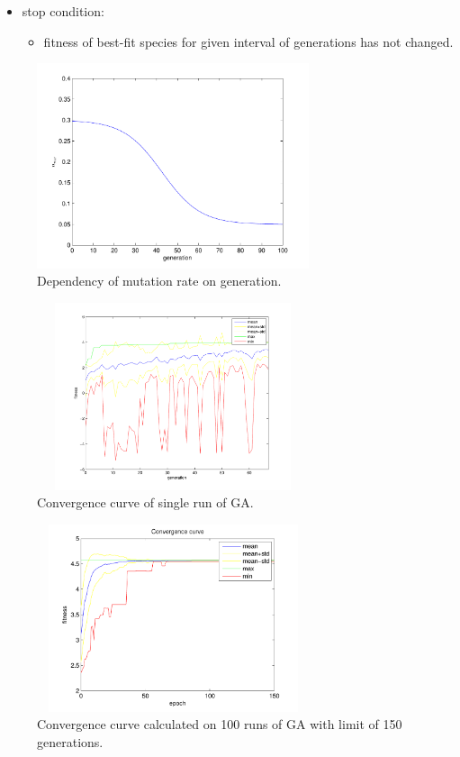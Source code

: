 \documentclass[a4paper,jurnal]{IEEEtran}
\begin{document}
\begin{itemize}
	\item stop condition:
	\begin{itemize}
		\item fitness of best-fit species for given interval of generations has not changed.
	\end{itemize}	
\end{itemize}
\begin{figure}[h]
	\centering
	\includegraphics[width=80mm]{mut_r}
	\caption{Dependency of mutation rate on generation.}
	\label{mut_r}
\end{figure}
\begin{figure}[h]
	\centering
	\includegraphics[width=80mm,height=55mm]{ga_conv_curve_s}
	\caption{Convergence curve of single run of GA.}
	\label{conv_curve_s}
\end{figure}
\begin{figure}[h]
	\centering
	\includegraphics[width=80mm,height=55mm]{ga_conv_curve}
	\caption{Convergence curve calculated on 100 runs of GA with limit of 150 generations.}
	\label{conv_curve}
\end{figure}
\end{document}
